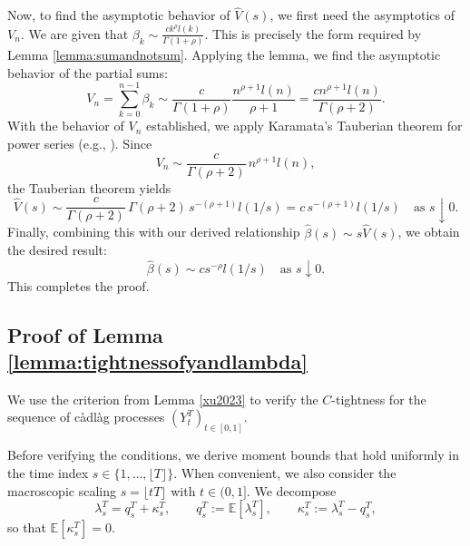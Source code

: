 \documentclass[letterpaper]{article}
\numberwithin{equation}{section}
\theoremstyle{definition}
\theoremstyle{remark}
\begin{document}
  Now, to find the asymptotic behavior of $\hat{V}(s)$, we first need the asymptotics of $V_n$. We are given that $\beta_k \sim \frac{c k^\rho l(k)}{\Gamma(1+\rho)}$. This is precisely the form required by Lemma \ref{lemma:sumandnotsum}. Applying the lemma, we find the asymptotic behavior of the partial sums:
  \[
    V_n = \sum_{k=0}^{n-1} \beta_k \sim \frac{c}{\Gamma(1+\rho)} \frac{n^{\rho+1}l(n)}{\rho+1} = \frac{c n^{\rho+1}l(n)}{\Gamma(\rho+2)}.
  \]
  {With the behavior of $V_n$ established, we apply Karamata's Tauberian theorem for power series (e.g., \cite[Corollary~1.7.3]{bingham1989regular}). Since
  \[
    V_n \sim \frac{c}{\Gamma(\rho+2)}\,n^{\rho+1}l(n),
  \]
  the Tauberian theorem yields}
  \[
    {\hat{V}(s) \sim \frac{c}{\Gamma(\rho+2)}\,\Gamma(\rho+2)\, s^{-(\rho+1)} l(1/s)
    = c\, s^{-(\rho+1)} l(1/s) \quad \text{as } s \downarrow 0.}
  \]
  Finally, combining this with our derived relationship $\hat{\beta}(s) \sim s\hat{V}(s)$, we obtain the desired result:
  \[
    \hat{\beta}(s) \sim c s^{-\rho} l(1/s) \quad \text{as } s \downarrow 0.
  \]
  This completes the proof.


\subsection{Proof of Lemma \ref{lemma:tightnessofyandlambda}}
\label{subsec:proofoftightnessofyandlambda}

We use the criterion from Lemma \ref{xu2023} to verify the $C$-tightness for the sequence of c\`adl\`ag processes $(Y_t^T)_{t\in[0,1]}$.

{Before verifying the conditions, we derive moment bounds that hold uniformly in the time index $s\in\{1,\dots,\lfloor T\rfloor\}$. When convenient, we also consider the macroscopic scaling $s=\lfloor tT\rfloor$ with $t\in(0,1]$.}
{We decompose}
\[
{
\lambda_s^T = q_s^T+\kappa_s^T,\qquad q_s^T:=\mathbb E[\lambda_s^T],\qquad \kappa_s^T:=\lambda_s^T-q_s^T,}
\]
{so that $\mathbb E[\kappa_s^T]=0$.}
\end{document}
